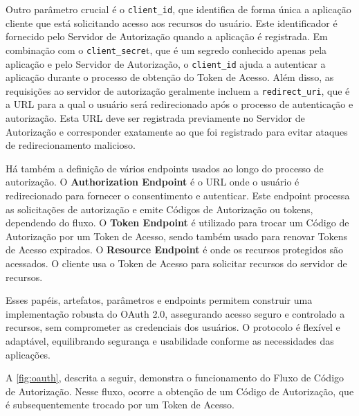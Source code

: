 Outro parâmetro crucial é o \texttt{client\_id}, que identifica de forma única a aplicação cliente que está solicitando acesso aos recursos do usuário. Este identificador é fornecido pelo Servidor de Autorização quando a aplicação é registrada. Em combinação com o \texttt{client\_secre}t, que é um segredo conhecido apenas pela aplicação e pelo Servidor de Autorização, o \texttt{client\_id} ajuda a autenticar a aplicação durante o processo de obtenção do Token de Acesso. Além disso, as requisições ao servidor de autorização geralmente incluem a \texttt{redirect\_uri}, que é a URL para a qual o usuário será redirecionado após o processo de autenticação e autorização. Esta URL deve ser registrada previamente no Servidor de Autorização e corresponder exatamente ao que foi registrado para evitar ataques de redirecionamento malicioso.

Há também a definição de vários endpoints usados ao longo do processo de autorização. O \textbf{Authorization Endpoint} é o URL onde o usuário é redirecionado para fornecer o consentimento e autenticar. Este endpoint processa as solicitações de autorização e emite Códigos de Autorização ou tokens, dependendo do fluxo. O \textbf{Token Endpoint} é utilizado para trocar um Código de Autorização por um Token de Acesso, sendo também usado para renovar Tokens de Acesso expirados. O \textbf{Resource Endpoint} é onde os recursos protegidos são acessados. O cliente usa o Token de Acesso para solicitar recursos do servidor de recursos.

Esses papéis, artefatos, parâmetros e endpoints permitem construir uma implementação robusta do OAuth 2.0, assegurando acesso seguro e controlado a recursos, sem comprometer as credenciais dos usuários. O protocolo é flexível e adaptável, equilibrando segurança e usabilidade conforme as necessidades das aplicações.


A \autoref{fig:oauth}, descrita a seguir, demonstra o funcionamento do Fluxo de Código de Autorização. Nesse fluxo, ocorre a obtenção de um Código de Autorização, que é subsequentemente trocado por um Token de Acesso.




